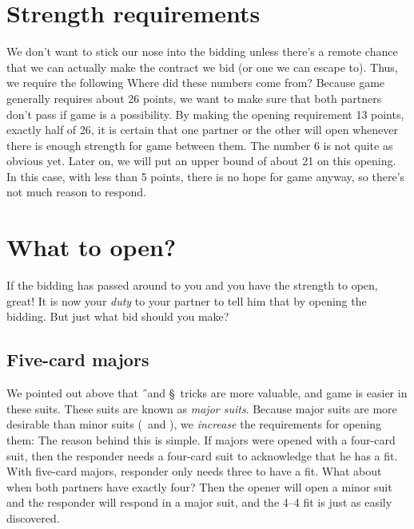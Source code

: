 \documentclass[oneside]{memoir}
\begin{document}
\section{Strength requirements}
We don't want to stick our nose into the bidding unless there's a remote
chance that we can actually make the contract we bid (or one we can escape to).
Thus, we require the following
Where did these numbers come from?  Because game generally requires about
26 points, we want to make sure that both partners don't pass if game is
a possibility.  By making the opening requirement 13 points, exactly half
of 26, it is certain that one partner or the other will open whenever there
is enough strength for game between them.  The number 6 is not quite as
obvious yet.  Later on, we will put an upper bound of about 21 on
this opening.  In this case, with less than 5 points, there is no hope for
game anyway, so there's not much reason to respond.

\section{What to open?}
If the bidding has passed around to you and you have the strength to open,
great!  It is now your \textit{duty} to your partner to tell him that by
opening the bidding.  But just what bid should you make?
\subsection{Five-card majors}
We pointed out above that \H\ and \S\ tricks are more valuable, and game
is easier in these suits.  These suits are known as \textit{major suits}.
Because major suits are more desirable than  minor suits (\C\ and \D),
we \textit{increase} the requirements for opening them:
The reason behind this is simple.  If majors were opened with a four-card
suit, then the responder needs a four-card suit to acknowledge that he
has a fit.  With five-card majors, responder only needs three to have
a fit.  What about when both partners have exactly four?  Then the opener
will open a minor suit and the responder will respond in a major suit, and
the 4--4 fit is just as easily discovered.
\end{document}
